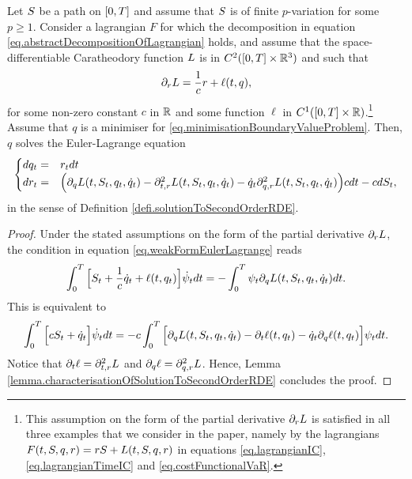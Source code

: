 \documentclass[10pt,a4paper]{article}
\begin{document}
\begin{appendices}
\begin{prop}\label{prop.eulerLagrangeNecessity}
 Let $S$ be  a path on ${[0,T]}$ and assume that $S$ is of finite $p$-variation for some $p\geq 1$. Consider a lagrangian $F$ for which the decomposition in equation \eqref{eq.abstractDecompositionOfLagrangian} holds, and assume that the space-differentiable Caratheodory function $L$ is in $C^{2}({[0,T]} \times \mathbb{R}^{3})$ and such that 
 \begin{equation*}
\partial_r L = \frac{1}{c}r + \ell(t,q),
 \end{equation*}
 for some non-zero constant $c$ in $\mathbb{R}$ and  some function $\ell$ in $C^{1}({[0,T]} \times \mathbb{R})$.\footnote{This assumption on the form of the partial derivative  $\partial_r L$ is satisfied in all three examples that we consider in the paper, namely by the lagrangians $F(t,S,q,r) = rS + L(t,S,q,r)$ in equations \eqref{eq.lagrangianIC}, \eqref{eq.lagrangianTimeIC} and \eqref{eq.costFunctionalVaR}.} Assume that $q$ is a minimiser for \eqref{eq.minimisationBoundaryValueProblem}. Then, $q$ solves the Euler-Lagrange equation 
 \begin{equation}\label{eq.strongFormEulerLagrangeEquation}
 \begin{cases}
 dq_t =&r_t dt \\
 dr_t = & \Big( \partial_q L (t,S_t,q_t,\dot{q}_t) - \partial^{2} _{t,r} L(t,S_t,q_t,\dot{q}_t) - \dot{q}_t \partial^{2} _{q,r} L(t,S_t,q_t,\dot{q}_t) \Big)c dt - cdS_t,
 \end{cases}
 \end{equation}
 in the sense of Definition \ref{defi.solutionToSecondOrderRDE}.
\end{prop}
\begin{proof}
Under the stated assumptions on the form of the partial derivative $\partial_r L$, the condition in equation \eqref{eq.weakFormEulerLagrange} reads
\begin{equation*}
\int_{0}^{T} \Big[ S_t + \frac{1}{c}\dot{q}_t + \ell(t,q_t)\Big]\dot{\psi}_t dt 
= - \int_{0}^{T} \psi_t \partial_q L (t,S_t,q_t,\dot{q}_t) dt . 
\end{equation*}
This is equivalent to 
\begin{equation*}
\int_{0}^{T} \Big[ cS_t + \dot{q}_t \Big]\dot{\psi}_t dt 
= - c\int_{0}^{T} \Big[\partial_q L (t,S_t,q_t,\dot{q}_t) - \partial_t \ell (t,q_t) - \dot{q}_t \partial_q \ell  (t,q_t) \Big]\psi_t  dt . 
\end{equation*}
Notice that $\partial_t \ell = \partial^{2} _{t,r} L $ and $\partial_q \ell = \partial^{2} _{q,r} L$. Hence, Lemma \ref{lemma.characterisationOfSolutionToSecondOrderRDE} concludes the proof. 
\end{proof}
\end{appendices}
\end{document}
